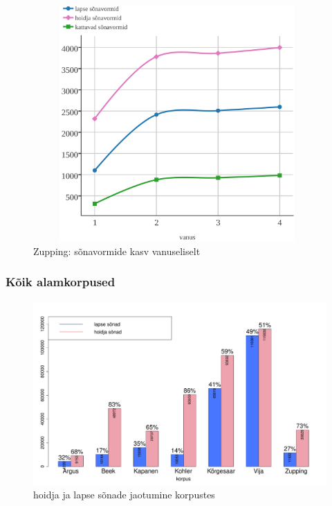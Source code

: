 \documentclass[12pt]{article}
\begin{document}

\begin{figure}[H]
    \centering
    \includegraphics[width=11cm, height=9cm]{zupping_kum_crop}
    \caption{Zupping: sõnavormide kasv vanuseliselt}
\end{figure}



\subsubsection{Kõik alamkorpused}



\begin{figure}[H]
    \centering
    \includegraphics[width=\textwidth]{koik_korpus_sonad}
    \caption{hoidja ja lapse sõnade jaotumine korpustes}
\end{figure}
\end{document}
